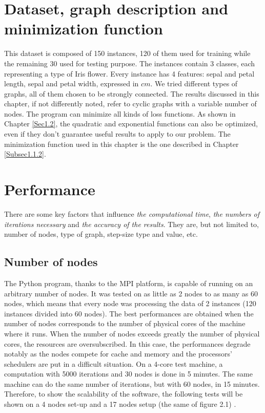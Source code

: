 \documentclass[a4paper,11pt,oneside]{book}
\begin{document}
\section{Dataset, graph description and minimization function} \label{Sec2.1}
This dataset is composed of 150 instances, 120 of them used for training while the remaining 30 used for testing purpose. The instances contain 3 classes, each representing a type of Iris flower. Every instance has 4 features: sepal and petal length, sepal and petal width, expressed in $cm$. We tried different types of graphs, all of them chosen to be strongly connected. The results discussed in this chapter, if not differently noted, refer to cyclic graphs with a variable number of nodes. The program can minimize all kinds of loss functions. As shown in Chapter \ref{Sec1.2}, the quadratic and exponential functions can also be optimized, even if they don't guarantee useful results to apply to our problem. The minimization function used in this chapter is the one described in Chapter \ref{Subsec1.1.2}.

\section{Performance} \label{Sec2.2}
There are some key factors that influence \textit{the computational time}, \textit{the numbers of iterations necessary} and \textit{the accuracy of the results}. They are, but not limited to, number of nodes, type of graph, step-size type and value, etc. \\

\subsection{Number of nodes} \label{Subsec2.2.1}
The Python program, thanks to the MPI platform, is capable of running on an arbitrary number of nodes. It was tested on as little as 2 nodes to as many as 60 nodes, which means that every node was processing the data of 2 instances (120 instances divided into 60 nodes). The best performances are obtained when the number of nodes corresponds to the number of physical cores of the machine where it runs. When the number of nodes exceeds greatly the number of physical cores, the resources are oversubscribed. In this case, the performances degrade notably as the nodes compete for cache and memory and the processors' schedulers are put in a difficult situation. On a 4-core test machine, a computation with 5000 iterations and 30 nodes is done in 5 minutes. The same machine can do the same number of iterations, but with 60 nodes, in 15 minutes. Therefore, to show the scalability of the software,  the following tests will be shown on a 4 nodes set-up and a 17 nodes setup (the same of figure 2.1) . \\
\end{document}
